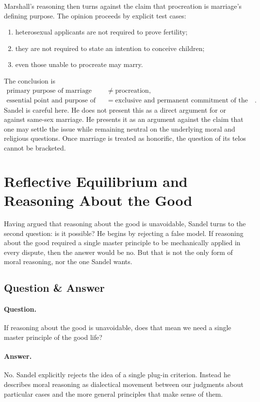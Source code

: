 Marshall's reasoning then turns against the claim that procreation is marriage's defining purpose. The opinion proceeds by explicit test cases:
\begin{enumerate}
\item heterosexual applicants are not required to prove fertility;
\item they are not required to state an intention to conceive children;
\item even those unable to procreate may marry.
\end{enumerate}
The conclusion is
\begin{align}
\text{primary purpose of marriage}
&\neq
\text{procreation},\\
\text{essential point and purpose of marriage}
&=
\text{exclusive and permanent commitment of the partners}.
\end{align}
Sandel is careful here. He does not present this as a direct argument for or against same-sex marriage. He presents it as an argument against the claim that one may settle the issue while remaining neutral on the underlying moral and religious questions. Once marriage is treated as honorific, the question of its telos cannot be bracketed.

\section{Reflective Equilibrium and Reasoning About the Good}

Having argued that reasoning about the good is unavoidable, Sandel turns to the second question: is it possible? He begins by rejecting a false model. If reasoning about the good required a single master principle to be mechanically applied in every dispute, then the answer would be no. But that is not the only form of moral reasoning, nor the one Sandel wants.

\subsection{Question \& Answer}

\paragraph{Question.} If reasoning about the good is unavoidable, does that mean we need a single master principle of the good life?

\paragraph{Answer.} No. Sandel explicitly rejects the idea of a single plug-in criterion. Instead he describes moral reasoning as dialectical movement between our judgments about particular cases and the more general principles that make sense of them.

